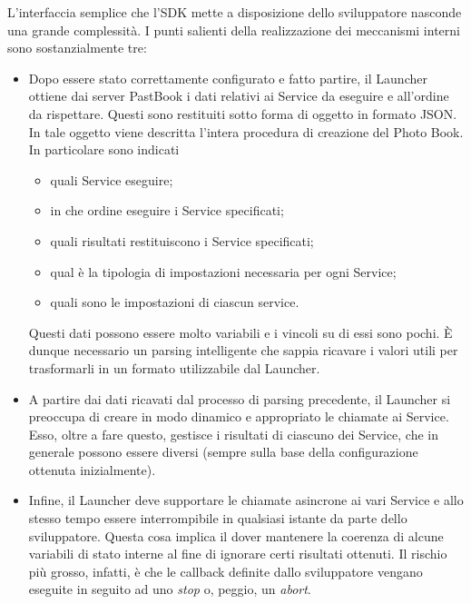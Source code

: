 				L'interfaccia semplice che l'SDK mette a disposizione dello sviluppatore nasconde una grande complessità. I punti
				salienti della realizzazione dei meccanismi interni sono sostanzialmente tre:
				\begin{itemize}
					\item Dopo essere stato correttamente configurato e fatto partire, il Launcher ottiene dai server PastBook i
					dati relativi ai Service da eseguire e all'ordine da rispettare. Questi sono restituiti sotto forma di
					oggetto in formato JSON. In tale oggetto viene descritta l'intera procedura di creazione del Photo Book.
					In particolare sono indicati
					\begin{itemize}
						\item quali Service eseguire;
						\item in che ordine eseguire i Service specificati;
						\item quali risultati restituiscono i Service specificati;
						\item qual è la tipologia di impostazioni necessaria per ogni Service;
						\item quali sono le impostazioni di ciascun service.
					\end{itemize}
					Questi dati possono essere molto variabili e i vincoli su di essi sono pochi. È dunque necessario un parsing
					intelligente che sappia ricavare i valori utili per trasformarli in un formato utilizzabile dal Launcher.
					\item A partire dai dati ricavati dal processo di parsing precedente, il Launcher si preoccupa di creare in
					modo dinamico e appropriato le chiamate ai Service. Esso, oltre a fare questo, gestisce i risultati di
					ciascuno dei Service, che in generale possono essere diversi (sempre sulla base della configurazione
					ottenuta inizialmente).
					\item Infine, il Launcher deve supportare le chiamate asincrone ai vari Service e allo stesso tempo essere
					interrompibile in qualsiasi istante da parte dello sviluppatore. Questa cosa implica il dover mantenere la
					coerenza di alcune variabili di stato interne al fine di ignorare certi risultati ottenuti. Il rischio più
					grosso, infatti, è che le callback definite dallo sviluppatore vengano eseguite in seguito ad uno
					\emph{stop} o, peggio, un \emph{abort}.
				\end{itemize}
